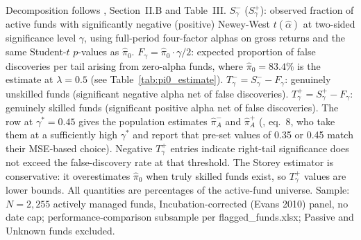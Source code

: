 \begin{table}[!htbp]
\begin{minipage}{\tabletempwidth}
\begin{singlespace}
Decomposition follows \textcite{BarrasScailletWermers2010}, Section~II.B and Table~III. $S^-_\gamma$ ($S^+_\gamma$): observed fraction of active funds with significantly negative (positive) Newey-West $t(\hat{\alpha})$ at two-sided significance level $\gamma$, using full-period \textcite{Carhart1997} four-factor alphas on gross returns and the same Student-$t$ $p$-values as $\hat{\pi}_0$. $F_\gamma = \hat{\pi}_0 \cdot \gamma/2$: expected proportion of false discoveries per tail arising from zero-alpha funds, where $\hat{\pi}_0 = 83.4\%$ is the \textcite{Storey2002} estimate at $\lambda = 0.5$ (see Table~\ref{tab:pi0_estimate}). $T^-_\gamma = S^-_\gamma - F_\gamma$: genuinely unskilled funds (significant negative alpha net of false discoveries). $T^+_\gamma = S^+_\gamma - F_\gamma$: genuinely skilled funds (significant positive alpha net of false discoveries). The row at $\gamma^* = 0.45$ gives the population estimates $\hat{\pi}^-_A$ and $\hat{\pi}^+_A$ (\citealt{BarrasScailletWermers2010}, eq.~8, who take them at a sufficiently high $\gamma^*$ and report that pre-set values of 0.35 or 0.45 match their MSE-based choice). Negative $T^+_\gamma$ entries indicate right-tail significance does not exceed the false-discovery rate at that threshold. The Storey estimator is conservative: it overestimates $\hat{\pi}_0$ when truly skilled funds exist, so $T^+_\gamma$ values are lower bounds. All quantities are percentages of the active-fund universe. Sample: $N = 2,255$ actively managed funds, Incubation-corrected (Evans 2010) panel, no date cap; performance-comparison subsample per flagged\_funds.xlsx; Passive and Unknown funds excluded.
\end{singlespace}
\end{minipage}
\end{table}

